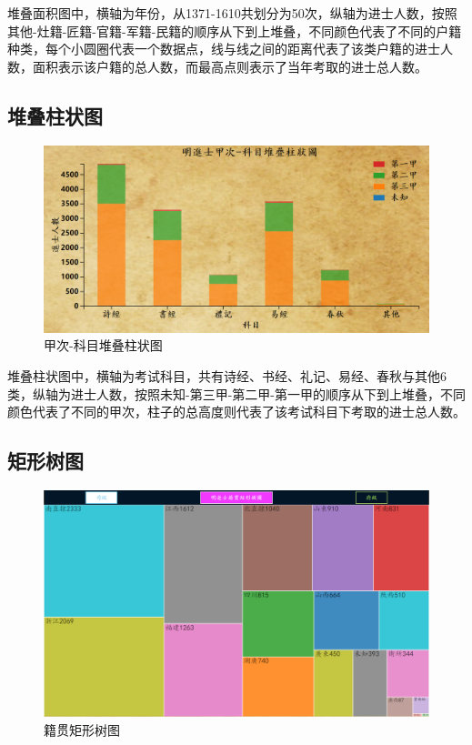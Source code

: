 \documentclass[11pt]{article}
\begin{document}
	堆叠面积图中，横轴为年份，从1371-1610共划分为50次，纵轴为进士人数，按照其他-灶籍-匠籍-官籍-军籍-民籍的顺序从下到上堆叠，不同颜色代表了不同的户籍种类，每个小圆圈代表一个数据点，线与线之间的距离代表了该类户籍的进士人数，面积表示该户籍的总人数，而最高点则表示了当年考取的进士总人数。

	\subsection{堆叠柱状图}
	\begin{figure}[H]
		\centering
		\includegraphics[width=12.5cm]{../Figure/StackedBarchart.png}
		\caption{甲次-科目堆叠柱状图}
	\end{figure}

	堆叠柱状图中，横轴为考试科目，共有诗经、书经、礼记、易经、春秋与其他6类，纵轴为进士人数，按照未知-第三甲-第二甲-第一甲的顺序从下到上堆叠，不同颜色代表了不同的甲次，柱子的总高度则代表了该考试科目下考取的进士总人数。

	\subsection{矩形树图}
	\begin{figure}[H]
		\centering
		\includegraphics[width=12.5cm]{../Figure/SquarifiedTreemap.png}
		\caption{籍贯矩形树图}
	\end{figure}
	
\end{document}
